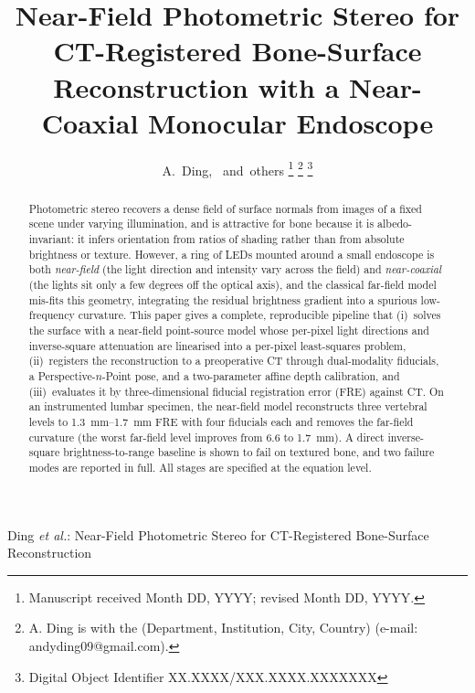 \documentclass[journal]{IEEEtran}
\begin{document}
\title{Near-Field Photometric Stereo for CT-Registered Bone-Surface
Reconstruction with a Near-Coaxial Monocular Endoscope}

\author{A.~Ding,~\IEEEmembership{}
        and~others%
\thanks{Manuscript received Month DD, YYYY; revised Month DD, YYYY.}%
\thanks{A. Ding is with the (Department, Institution, City, Country)
(e-mail: andyding09@gmail.com).}%
\thanks{Digital Object Identifier XX.XXXX/XXX.XXXX.XXXXXXX}}

%
{Ding \MakeLowercase{\textit{et al.}}: Near-Field Photometric Stereo for
CT-Registered Bone-Surface Reconstruction}

\maketitle

\begin{abstract}
Photometric stereo recovers a dense field of surface normals from images of a
fixed scene under varying illumination, and is attractive for bone because it is
albedo-invariant: it infers orientation from ratios of shading rather than from
absolute brightness or texture. However, a ring of LEDs mounted around a small
endoscope is both \emph{near-field} (the light direction and intensity vary across
the field) and \emph{near-coaxial} (the lights sit only a few degrees off the
optical axis), and the classical far-field model mis-fits this geometry, integrating
the residual brightness gradient into a spurious low-frequency curvature. This paper
gives a complete, reproducible pipeline that (i)~solves the surface with a near-field
point-source model whose per-pixel light directions and inverse-square attenuation
are linearised into a per-pixel least-squares problem, (ii)~registers the
reconstruction to a preoperative CT through dual-modality fiducials, a
Perspective-$n$-Point pose, and a two-parameter affine depth calibration, and
(iii)~evaluates it by three-dimensional fiducial registration error (FRE) against CT.
On an instrumented lumbar specimen, the near-field model reconstructs three vertebral
levels to \SIrange{1.3}{1.7}{\milli\meter} FRE with four fiducials each and removes
the far-field curvature (the worst far-field level improves from \num{6.6} to
\SI{1.7}{\milli\meter}). A direct inverse-square brightness-to-range baseline is
shown to fail on textured bone, and two failure modes are reported in full. All
stages are specified at the equation level.
\end{abstract}
\end{document}
